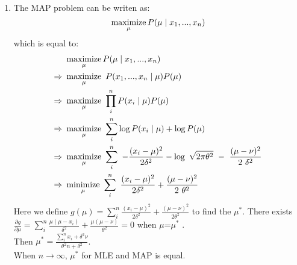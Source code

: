 \documentclass[a4paper]{article}
\begin{document}
\begin{enumerate}
\begin{enumerate}
  \item
    The MAP problem can be writen as:
    \begin{equation*}
      \operatorname*{maximize}_{\mu} P(\mu \mid x_1,...,x_n)
    \end{equation*}
    which is equal to:
    \begin{equation*}
      \begin{aligned}
      &\maximize_{\mu} P(\mu\mid x_1,...,x_n)\\
      \Rightarrow &\maximize_{\mu} P(x_1,...,x_n\mid\mu)P(\mu)\\
      \Rightarrow &\maximize_{\mu} \prod_i^n P(x_i\mid\mu)P(\mu)\\
      \Rightarrow &\maximize_{\mu} \sum_i^n \log P(x_i\mid\mu) + \log P(\mu)\\
      \Rightarrow &\maximize_{\mu} \sum_i^n -\frac{(x_i-\mu)^2}{2\delta^2} - \log \sqrt{2\pi\theta^2} - \frac{(\mu - \nu)^2}{2 \delta^2}\\
      \Rightarrow &\minimize_{\mu} \sum_i^n \frac{(x_i-\mu)^2}{2\delta^2} + \frac{(\mu - \nu)^2}{2 \theta^2}\\
      \end{aligned}
    \end{equation*}
    Here we define $g(\mu) = \sum_i^n \frac{(x_i-\mu)^2}{2\delta^2} + \frac{(\mu - \nu)^2}{2 \theta^2}$ to find the $\mu^*$. There exists $\frac{\partial g}{\partial \mu} = \sum_i^n \frac{\mu(\mu-x_i)}{\delta^2} + \frac{\mu(\mu - \nu)}{\theta^2} = 0$ when $\mu$=$\mu^*$ .\\
    Then $\mu^* = \frac{\sum_i^n x_i + \delta^2\nu}{\theta^2n+\delta^2}$.\\
    When $n \rightarrow \infty$, $\mu^*$ for MLE and MAP is equal.
  \end{enumerate}


\end{enumerate}
\end{document}
